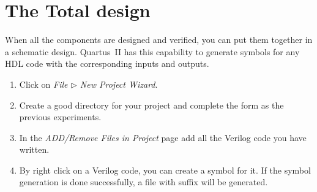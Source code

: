 \documentclass[12pt, logo=tehranDLDL/ut]{tehranDLDL}
\begin{document}
\designverification{}

\section{The Total design}

When all the components are designed and verified, you can put them together in a schematic design. Quartus~II has this
capability to generate symbols for any HDL code with the corresponding inputs and outputs. 

\begin{enumerate}
    \item Click on \textit{File $\rhd$ New Project Wizard}.
    \item Create a good directory for your project and complete the form as the previous experiments.
    \item In the \textit{ADD/Remove Files in Project} page add all the Verilog code you have written.
    \item By right click on a Verilog code, you can create a symbol for it. If the symbol generation is done successfully, a file with suffix  will be generated.
\end{enumerate}
\end{document}
